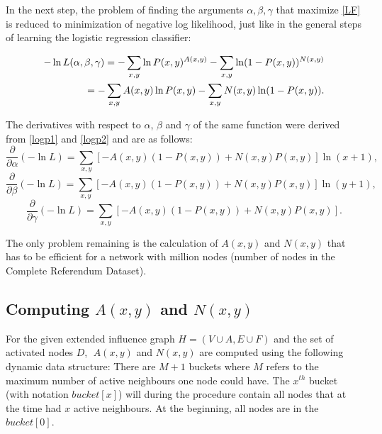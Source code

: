 \documentclass[times, utf8, zavrsni]{fer}
\begin{document}
In the next step, the problem of finding the arguments $\alpha, \beta, \gamma$ that maximize \eqref{LF} is reduced to minimization of negative log likelihood, just like in the general steps of learning the logistic regression classifier:

\begin{equation}
\centering
\begin{split}
 -\ln L(\alpha, \beta, \gamma) = -\sum_{x, y} \ln P(x, y) ^ {A(x, y)} - \sum_{x, y} \ln(1 - P(x, y)) ^ {N(x, y)}   \\ = -\sum_{x, y} A(x, y) \ln P(x, y) - \sum_{x, y} N(x, y) \ln (1 - P(x, y)). 
\end{split}
\end{equation}

The derivatives with respect to $\alpha$, $\beta$ and $\gamma$ of the same function were derived from \eqref{logp1} and \eqref{logp2} and are as follows: 
\begin{equation}
\frac{\partial}{\partial \alpha}(-\ln L)= 
 \sum_{x, y}  \left[ -A(x, y) (1 - P(x, y)) + N(x, y) P(x, y) \right] \ln(x + 1),
\label{dera}
\end{equation}
\begin{equation}
\frac{\partial}{\partial \beta }(-\ln L) = \sum_{x, y} \left[ -A(x, y)  (1 - P(x, y)) + N(x, y)P(x, y) \right] \ln(y  + 1),
\label{derb}
\end{equation}
\begin{equation}
\frac{\partial}{\partial \gamma } (-\ln L) = \sum_{x, y} \left[ -A(x, y)  (1 - P(x, y)) +  N(x, y) P(x, y) \right].
\label{derg}
\end{equation}

The only problem remaining is the calculation of $A(x, y)$ and $N(x, y)$ that has to be efficient for a network with million nodes (number of nodes in the Complete Referendum Dataset).

\subsection{Computing $A(x, y)$ and $N(x, y)$}

For the given extended influence graph $H = (V \cup A, E \cup F)$ and the set of activated nodes  $D$, $\; A(x, y)$ and $N(x, y)$ are computed using the following dynamic data structure: There are $M + 1$ buckets where $M$ refers to the maximum number of active neighbours one node could have. The $x^{th}$ bucket   (with notation $bucket[x]$) will during the procedure contain all nodes that at the time had $x$ active neighbours. At the beginning, all nodes are in the $bucket[0]$.
 
\end{document}
